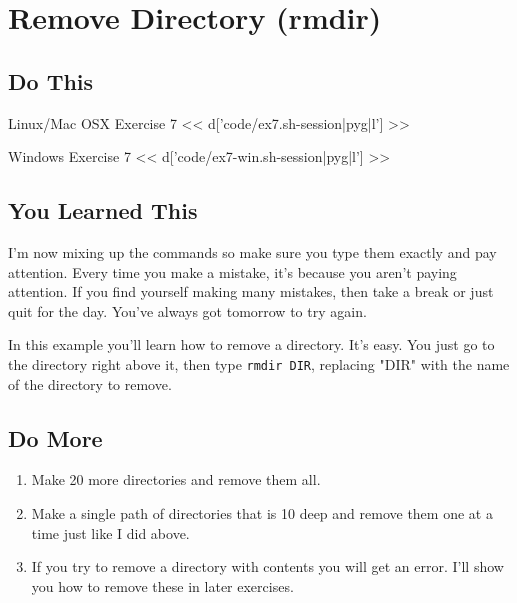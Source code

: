 \chapter{Remove Directory (rmdir)}

\section{Do This}

\begin{code}{Linux/Mac OSX Exercise 7}
<< d['code/ex7.sh-session|pyg|l'] >>
\end{code}

\begin{code}{Windows Exercise 7}
<< d['code/ex7-win.sh-session|pyg|l'] >>
\end{code}


\section{You Learned This}

I'm now mixing up the commands so make sure you type them exactly and pay attention.
Every time you make a mistake, it's because you aren't paying attention.  If you
find yourself making many mistakes, then take a break or just quit for the day.
You've always got tomorrow to try again.

In this example you'll learn how to remove a directory.  It's easy. You just
go to the directory right above it, then type \verb|rmdir DIR|, replacing "DIR"
with the name of the directory to remove.

\section{Do More}

\begin{enumerate}
\item Make 20 more directories and remove them all.
\item Make a single path of directories that is 10 deep and remove them one at a
    time just like I did above.
\item If you try to remove a directory with contents you will get an error.
    I'll show you how to remove these in later exercises.
\end{enumerate}

